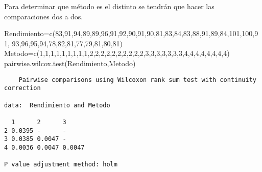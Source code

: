 \documentclass[
  a4paper,
  oneside,
  openany]{book}
\newenvironment{Shaded}{\begin{snugshade}}{\end{snugshade}}
\newcommand{\DecValTok}[1]{\textcolor[rgb]{0.00,0.00,0.81}{#1}}
\newcommand{\FunctionTok}[1]{\textcolor[rgb]{0.00,0.00,0.00}{#1}}
\newcommand{\NormalTok}[1]{#1}
\newcommand{\OtherTok}[1]{\textcolor[rgb]{0.56,0.35,0.01}{#1}}
\begin{document}
Para determinar que método es el distinto se tendrán que hacer las comparaciones dos a dos.

\begin{Shaded}
\begin{Highlighting}[]
\NormalTok{Rendimiento}\OtherTok{=}\FunctionTok{c}\NormalTok{(}\DecValTok{83}\NormalTok{,}\DecValTok{91}\NormalTok{,}\DecValTok{94}\NormalTok{,}\DecValTok{89}\NormalTok{,}\DecValTok{89}\NormalTok{,}\DecValTok{96}\NormalTok{,}\DecValTok{91}\NormalTok{,}\DecValTok{92}\NormalTok{,}\DecValTok{90}\NormalTok{,}\DecValTok{91}\NormalTok{,}\DecValTok{90}\NormalTok{,}\DecValTok{81}\NormalTok{,}\DecValTok{83}\NormalTok{,}\DecValTok{84}\NormalTok{,}\DecValTok{83}\NormalTok{,}\DecValTok{88}\NormalTok{,}\DecValTok{91}\NormalTok{,}\DecValTok{89}\NormalTok{,}\DecValTok{84}\NormalTok{,}\DecValTok{101}\NormalTok{,}\DecValTok{100}\NormalTok{,}\DecValTok{91}\NormalTok{,}
              \DecValTok{93}\NormalTok{,}\DecValTok{96}\NormalTok{,}\DecValTok{95}\NormalTok{,}\DecValTok{94}\NormalTok{,}\DecValTok{78}\NormalTok{,}\DecValTok{82}\NormalTok{,}\DecValTok{81}\NormalTok{,}\DecValTok{77}\NormalTok{,}\DecValTok{79}\NormalTok{,}\DecValTok{81}\NormalTok{,}\DecValTok{80}\NormalTok{,}\DecValTok{81}\NormalTok{)}
\NormalTok{Metodo}\OtherTok{=}\FunctionTok{c}\NormalTok{(}\DecValTok{1}\NormalTok{,}\DecValTok{1}\NormalTok{,}\DecValTok{1}\NormalTok{,}\DecValTok{1}\NormalTok{,}\DecValTok{1}\NormalTok{,}\DecValTok{1}\NormalTok{,}\DecValTok{1}\NormalTok{,}\DecValTok{1}\NormalTok{,}\DecValTok{1}\NormalTok{,}\DecValTok{2}\NormalTok{,}\DecValTok{2}\NormalTok{,}\DecValTok{2}\NormalTok{,}\DecValTok{2}\NormalTok{,}\DecValTok{2}\NormalTok{,}\DecValTok{2}\NormalTok{,}\DecValTok{2}\NormalTok{,}\DecValTok{2}\NormalTok{,}\DecValTok{2}\NormalTok{,}\DecValTok{2}\NormalTok{,}\DecValTok{3}\NormalTok{,}\DecValTok{3}\NormalTok{,}\DecValTok{3}\NormalTok{,}\DecValTok{3}\NormalTok{,}\DecValTok{3}\NormalTok{,}\DecValTok{3}\NormalTok{,}\DecValTok{3}\NormalTok{,}\DecValTok{4}\NormalTok{,}\DecValTok{4}\NormalTok{,}\DecValTok{4}\NormalTok{,}\DecValTok{4}\NormalTok{,}\DecValTok{4}\NormalTok{,}\DecValTok{4}\NormalTok{,}\DecValTok{4}\NormalTok{,}\DecValTok{4}\NormalTok{)}
\FunctionTok{pairwise.wilcox.test}\NormalTok{(Rendimiento,Metodo)}
\end{Highlighting}
\end{Shaded}

\begin{verbatim}
    Pairwise comparisons using Wilcoxon rank sum test with continuity correction 

data:  Rendimiento and Metodo 

  1      2      3     
2 0.0395 -      -     
3 0.0385 0.0047 -     
4 0.0036 0.0047 0.0047

P value adjustment method: holm 
\end{verbatim}
\end{document}
